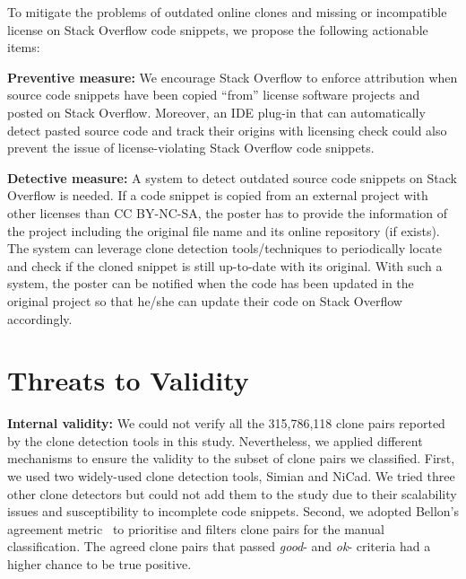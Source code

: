 \documentclass[sigconf,review, anonymous]{acmart}
\begin{document}
To mitigate the problems of outdated online clones and missing or incompatible license on Stack Overflow code snippets, we propose the following actionable items: 

\textbf{Preventive measure:} We encourage Stack Overflow to enforce attribution when source code snippets have been copied ``from'' license software projects and posted on Stack Overflow. Moreover, an IDE plug-in that can automatically detect pasted source code and track their origins with licensing check could also prevent the issue of license-violating Stack Overflow code snippets.

\textbf{Detective measure:} A system to detect outdated source code snippets on Stack Overflow is needed. If a code snippet is copied from an external project with other licenses than CC BY-NC-SA, the poster has to provide the information of the project including the original file name and its online repository (if exists). The system can leverage clone detection tools/techniques to periodically locate and check if the cloned snippet is still up-to-date with its original. With such a system, the poster can be notified when the code has been updated in the original project so that he/she can update their code on Stack Overflow accordingly.

\section{Threats to Validity}

\textbf{Internal validity:} 
%
We could not verify all the 315,786,118 clone pairs reported by the
clone detection tools in this study.  Nevertheless, we applied
different mechanisms to ensure the validity to the subset of clone
pairs we classified.  First, we used two widely-used
clone detection tools, Simian and NiCad.  We tried three other
clone detectors but could not add them to the study due to their
scalability issues and susceptibility to incomplete code snippets.
Second, we adopted Bellon's agreement metric~\cite{Bellon2007}
to prioritise and filters clone pairs for the manual
classification. The agreed clone pairs that passed \textit{good}- and
\textit{ok}- criteria had a higher chance to be true positive. 
\end{document}
